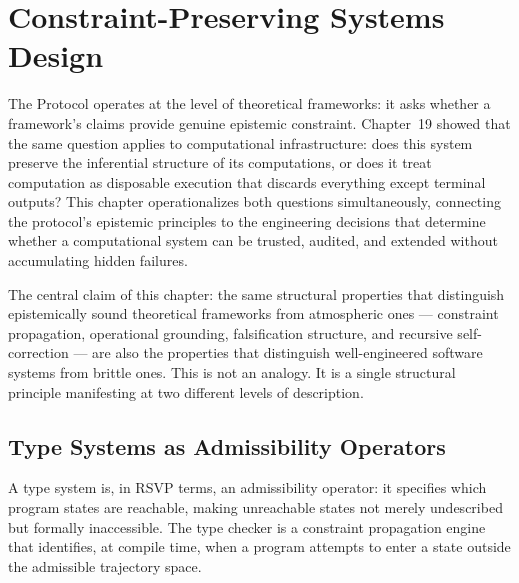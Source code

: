 
\chapter{Constraint-Preserving Systems Design}
\label{ch:systems-design}


\noindent
The \Ortyx{} Protocol operates at the level of theoretical
frameworks: it asks whether a framework's claims provide
genuine epistemic constraint. Chapter~19 showed that
the same question applies to computational infrastructure:
does this system preserve the inferential structure
of its computations, or does it treat computation as
disposable execution that discards everything except
terminal outputs? This chapter operationalizes both
questions simultaneously, connecting the protocol's
epistemic principles to the engineering decisions that
determine whether a computational system can be
trusted, audited, and extended without accumulating
hidden failures.

The central claim of this chapter: the same structural
properties that distinguish epistemically sound
theoretical frameworks from atmospheric ones ---
constraint propagation, operational grounding, falsification
structure, and recursive self-correction --- are
also the properties that distinguish well-engineered
software systems from brittle ones. This is not an
analogy. It is a single structural principle manifesting
at two different levels of description.

\section{Type Systems as Admissibility Operators}
\label{sec:type-systems}

A type system is, in RSVP terms, an admissibility
operator: it specifies which program states are
reachable, making unreachable states not merely
undescribed but formally inaccessible. The type
checker is a constraint propagation engine that
identifies, at compile time, when a program attempts
to enter a state outside the admissible trajectory
space.

